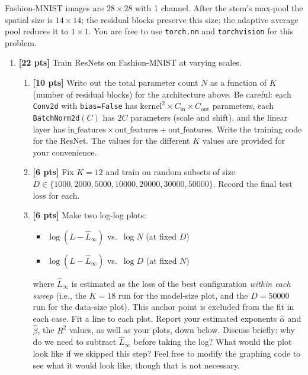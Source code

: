 \documentclass[submit]{../harvardml}
\begin{document}
\begin{problem}
Fashion-MNIST images are $28 \times 28$ with 1 channel. After the stem's max-pool the spatial size is $14 \times 14$; the residual blocks preserve this size; the adaptive average pool reduces it to $1 \times 1$. You are free to use \texttt{torch.nn} and \texttt{torchvision} for this problem.
\begin{enumerate}[label=(\alph*)]
\item \textbf{[22 pts]} Train ResNets on Fashion-MNIST at varying scales.
\begin{enumerate}[label=(\roman*)]
    \item \textbf{[10 pts]} Write out the total parameter count $N$ as a function of $K$ (number of residual blocks) for the architecture above. Be careful: each \texttt{Conv2d} with \texttt{bias=False} has $\text{kernel}^2 \times C_{\text{in}} \times C_{\text{out}}$ parameters, each \texttt{BatchNorm2d}$(C)$ has $2C$ parameters (scale and shift), and the linear layer has $\text{in\_features} \times \text{out\_features} + \text{out\_features}$.
    Write the training code for the ResNet. The values for the different $K$ values are provided for your convenience.
    \item \textbf{[6 pts]} Fix $K = 12$ and train on random subsets of size\\ $D \in \{1000, 2000, 5000, 10000, 20000, 30000, 50000\}$. Record the final test loss for each.
    \item \textbf{[6 pts]} Make two log-log plots:
    \begin{itemize}
        \item $\log(L - \hat{L}_\infty)$ vs.\ $\log N$ (at fixed $D$)
        \item $\log(L - \hat{L}_\infty)$ vs.\ $\log D$ (at fixed $N$)
    \end{itemize}
    where $\hat{L}_\infty$ is estimated as the loss of the best configuration \emph{within each sweep} (i.e., the $K=18$ run for the model-size plot, and the $D=50000$ run for the data-size plot). This anchor point is excluded from the fit in each case.
    Fit a line to each plot. Report your estimated exponents $\hat{\alpha}$ and $\hat{\beta}$, the $R^2$ values, as well as your plots, down below.
    Discuss briefly: why do we need to subtract $\hat{L}_\infty$ before taking the log? What would the plot look like if we skipped this step? Feel free to modify the graphing code to see what it would look like, though that is not necessary.
\end{enumerate}

\end{enumerate}
\end{problem}
\end{document}
